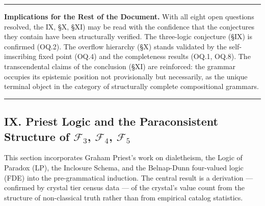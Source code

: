 \documentclass[12pt,a4paper]{article}
\begin{document}
\begin{center}
\rule{0.5\textwidth}{0.4pt}
\end{center}

\textbf{Implications for the Rest of the Document.} With all eight open questions resolved, the
IX, \S X, \S XI) may be read with the confidence that the conjectures they contain have been structurally verified. The
three-logic conjecture (\S IX) is confirmed (OQ.2). The overflow hierarchy (\S X) stands validated by the
self-imscribing fixed point (OQ.4) and the completeness results (OQ.1, OQ.8). The transcendental claims of the
conclusion (\S XI) are reinforced: the grammar occupies its epistemic position not provisionally but necessarily, as
the unique terminal object in the category of structurally complete compositional grammars.

\begin{center}
\rule{0.5\textwidth}{0.4pt}
\end{center}


\subsection{IX. Priest Logic and the Paraconsistent Structure of \texorpdfstring{$\mathcal{F}_3$, $\mathcal{F}_4$, $\mathcal{F}_5$}{F3, F4, F5}}
This section incorporates Graham Priest's work on dialetheism, the Logic of Paradox (LP), the Inclosure Schema, and the
Belnap-Dunn four-valued logic (FDE) into the pre-grammatical induction. The central result is a derivation ---
confirmed by crystal tier census data --- of the crystal's value count from the structure of non-classical truth rather
than from empirical catalog statistics.
\end{document}
